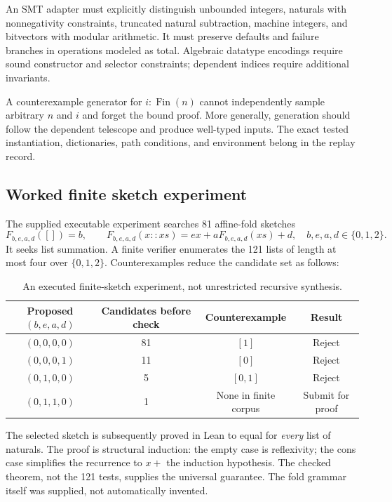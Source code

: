 \documentclass[11pt,letterpaper]{article}
\newcommand{\code}[1]{\texttt{\detokenize{#1}}}
\theoremstyle{definition}\newtheorem{definition}[theorem]{Definition}
\theoremstyle{remark}\newtheorem{remark}[theorem]{Remark}
\begin{document}
An SMT adapter must explicitly distinguish unbounded integers, naturals with
nonnegativity constraints, truncated natural subtraction, machine integers,
and bitvectors with modular arithmetic. It must preserve defaults and failure
branches in operations modeled as total. Algebraic datatype encodings require
sound constructor and selector constraints; dependent indices require additional
invariants.

A counterexample generator for $i:\operatorname{Fin}(n)$ cannot independently
sample arbitrary $n$ and $i$ and forget the bound proof. More generally,
generation should follow the dependent telescope and produce well-typed inputs.
The exact tested instantiation, dictionaries, path conditions, and environment
belong in the replay record.

\subsection{Worked finite sketch experiment}

The supplied executable experiment searches 81 affine-fold sketches
\[
 F_{b,e,a,d}([])=b,\qquad
 F_{b,e,a,d}(x::xs)=e x+aF_{b,e,a,d}(xs)+d,
 \quad b,e,a,d\in\{0,1,2\}.
\]
It seeks list summation. A finite verifier enumerates the 121 lists of length at
most four over $\{0,1,2\}$. Counterexamples reduce the candidate set as follows:

\begin{table}[ht]\centering\small
\begin{tabular}{@{}cccc@{}}
\toprule Proposed $(b,e,a,d)$ & Candidates before check & Counterexample & Result \\
\midrule
$(0,0,0,0)$ & 81 & $[1]$ & Reject \\
$(0,0,0,1)$ & 11 & $[0]$ & Reject \\
$(0,1,0,0)$ & 5 & $[0,1]$ & Reject \\
$(0,1,1,0)$ & 1 & None in finite corpus & Submit for proof \\
\bottomrule
\end{tabular}
\caption{An executed finite-sketch experiment, not unrestricted recursive synthesis.}
\label{tab:cegis}
\end{table}

The selected sketch is subsequently proved in Lean to equal \code{List.sum}
for \emph{every} list of naturals. The proof is structural induction: the empty
case is reflexivity; the cons case simplifies the recurrence to $x+$ the
induction hypothesis. The checked theorem, not the 121 tests, supplies the
universal guarantee. The fold grammar itself was supplied, not automatically
invented.
\end{document}
